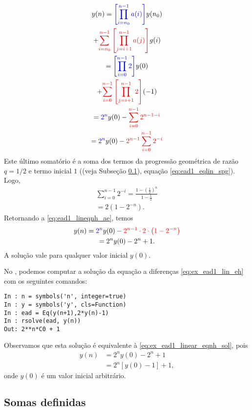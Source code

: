 \begin{ex}
\begin{enumerate}
  \begin{gather}
    y(n) = {\color{blue}\left[\prod_{i=n_0}^{n-1} a(i)\right]}y(n_0) \\
    + {\color{red}\sum_{i=n_0}^{n-1}\left[\prod_{j=i+1}^{n-1} a(j)\right]}g(i) \\
    = {\color{blue}\left[\prod_{i=0}^{n-1} 2\right]}y(0) \\
    + {\color{red}\sum_{i=0}^{n-1}\left[\prod_{j=i+1}^{n-1} 2\right]}(-1) \\
    = {\color{blue}2^n}y(0) -{\color{red} \sum_{i=0}^{n-1}2^{n-1-i}}\\
    = {\color{blue}2^n}y(0) - {\color{red}2^{n-1}\sum_{i=0}^{n-1}2^{-i}}\label{eq:ead1_lineqnh_ae}
  \end{gather}
  Este último somatório é a soma dos termos da progressão geométrica de razão $q=1/2$ e termo inicial $1$ ((veja Subseção \ref{cap_ead1_sec_eqlin_subsec_sd}), equação \eqref{eq:ead1_eqlin_spg}). Logo,
  \begin{gather}
    \sum_{i=0}^{n-1}2^{-i} = \frac{1-\left(\frac{1}{2}\right)^n}{1-\frac{1}{2}}\\
    = 2\left(1-2^{-n}\right).
  \end{gather}
  Retornando a \eqref{eq:ead1_lineqnh_ae}, temos
  \begin{gather}
   y(n) = {\color{blue}2^n}y(0) - {\color{red}2^{n-1}\cdot 2\cdot \left(1 - 2^{-n}\right)}\\
    = 2^ny(0) - 2^{n} + 1. \label{eq:ex_ead1_linear_eqnh_sol}
  \end{gather}
  A solução vale para qualquer valor inicial $y(0)$.
\end{enumerate}
  \ifispython
  No \python, podemos computar a solução da equação a diferenças \eqref{eq:ex_ead1_lin_eh} com os seguintes comandos:
\begin{verbatim}
In : n = symbols('n', integer=true)
In : y = symbols('y', cls=Function)
In : ead = Eq(y(n+1),2*y(n)-1)
In : rsolve(ead, y(n))
Out: 2**n*C0 + 1
\end{verbatim}
  Observamos que esta solução é equivalente à \eqref{eq:ex_ead1_linear_eqnh_sol}, pois
  \begin{align}
    y(n) &= 2^ny(0) - 2^{n} + 1 \\
         &= 2^n\left[y(0)-1\right]+1,
  \end{align}
  onde $y(0)$ é um valor inicial arbitrário.
  \fi
\end{ex}

\subsection{Somas definidas}\label{cap_ead1_sec_eqlin_subsec_sd}

